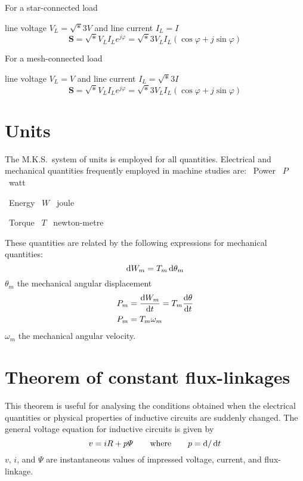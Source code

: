 \documentclass[a4paper,numbers=noenddot,12pt]{scrbook}
\begin{document}
        For a star-connected load

        \hspace{1cm} line voltage $V_L = \sqrt* 3 V$ and line current $I_L = I$
        \begin{equation}
            \mathbf{S} = \sqrt*  V_L I_L e^{j \varphi} = \sqrt* 3 V_L I_L (\cos \varphi + j \sin \varphi)
            \label{eq:Eq1.34}
        \end{equation}

        For a mesh-connected load

        \hspace{1cm} line voltage $V_L = V$ and line current $I_L = \sqrt* 3 I$
        \begin{equation}
            \mathbf{S} = \sqrt*  V_L I_L e^{j \varphi} = \sqrt* 3 V_L I_L (\cos \varphi + j \sin \varphi)
            \label{eq:Eq1.35}
        \end{equation}

        \section{Units}
        The M.K.S.\ system of units is employed for all quantities. Electrical and mechanical quantities frequently employed in machine studies are:
        \TabPositions{3cm,4.5cm,5.2cm}
        \tab\tab\ Power \tab\ $P$ \tab\ watt

        \tab\ Energy \tab\ $W$ \tab\ joule

        \tab\ Torque \tab\ $T$ \tab\ newton-metre

        These quantities are related by the following expressions for mechanical quantities:
        \begin{equation}
            \dif W_m = T_m \dif \theta_m
            \label{eq:Eq1.36}
        \end{equation}
        $\theta_m$ the mechanical angular displacement
        \begin{align}
            P_m & = \dfrac{\dif W_m}{\dif t} = T_m \dfrac{\dif \theta}{\dif t} \nonumber \\
            P_m & = T_m \omega_m
            \label{eq:Eq1.37}
        \end{align}
        $\omega_m$ the mechanical angular velocity.

        \section{Theorem of constant flux-linkages}
        This theorem is useful for analysing the conditions obtained when the electrical quantities or physical properties of inductive circuits are suddenly changed. The general voltage equation for inductive circuits is given by
        \begin{equation}
            v = iR + p\varPsi \qquad \text{where} \qquad p = \dif/\dif t
            \label{eq:Eq1.38}
        \end{equation}
        $v$, $i$, and $\varPsi$ are instantaneous values of impressed voltage, current, and flux-linkage.
\end{document}
